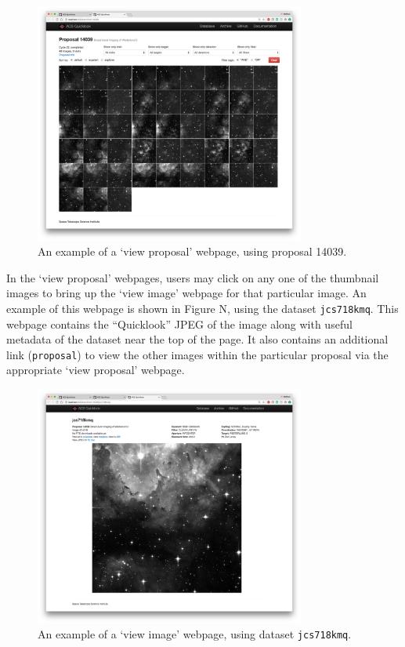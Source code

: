 \documentclass[10pt,journal,compsoc]{IEEEtran}
\begin{document}
\begin{figure}[!t]
\centering
\includegraphics[width=3.5in]{./figures/view_proposal.png}
\caption{An example of a `view proposal' webpage, using proposal 14039.}
\label{fig1}
\end{figure}

In the `view proposal' webpages, users may click on any one of the thumbnail images to bring up
the `view image' webpage for that particular image.  An example of this webpage is shown in Figure
N, using the dataset \texttt{jcs718kmq}.  This webpage contains the ``Quicklook'' JPEG of the image
along with useful metadata of the dataset near the top of the page.  It also contains an additional link
(\texttt{proposal}) to view the other images within the particular proposal via the appropriate
`view proposal' webpage.

\begin{figure}[!t]
\centering
\includegraphics[width=3.5in]{./figures/view_image.png}
\caption{An example of a `view image' webpage, using dataset \texttt{jcs718kmq}.}
\label{fig1}
\end{figure}
\end{document}
